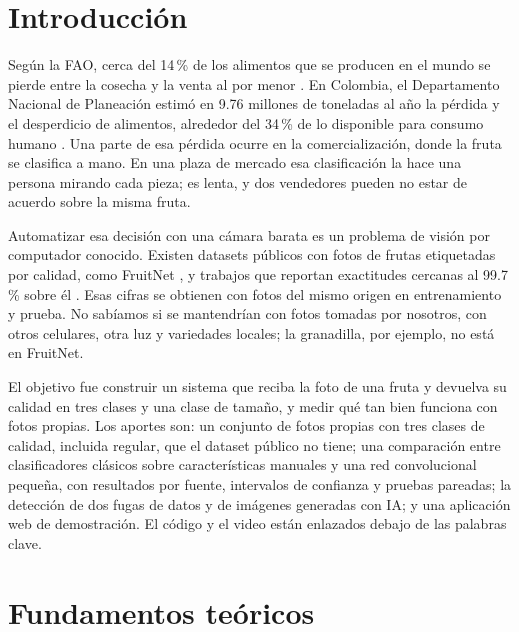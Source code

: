 \documentclass[conference]{IEEEtran}
\begin{document}
\section{Introducción}

Según la FAO, cerca del 14\,\% de los alimentos que se producen en el mundo se pierde entre la cosecha y la venta al por menor \cite{fao2019}. En Colombia, el Departamento Nacional de Planeación estimó en 9.76 millones de toneladas al año la pérdida y el desperdicio de alimentos, alrededor del 34\,\% de lo disponible para consumo humano \cite{dnp2016}. Una parte de esa pérdida ocurre en la comercialización, donde la fruta se clasifica a mano. En una plaza de mercado esa clasificación la hace una persona mirando cada pieza; es lenta, y dos vendedores pueden no estar de acuerdo sobre la misma fruta.

Automatizar esa decisión con una cámara barata es un problema de visión por computador conocido. Existen datasets públicos con fotos de frutas etiquetadas por calidad, como FruitNet \cite{meshram2022}, y trabajos que reportan exactitudes cercanas al 99.7\,\% sobre él \cite{morshed2022}. Esas cifras se obtienen con fotos del mismo origen en entrenamiento y prueba. No sabíamos si se mantendrían con fotos tomadas por nosotros, con otros celulares, otra luz y variedades locales; la granadilla, por ejemplo, no está en FruitNet.

El objetivo fue construir un sistema que reciba la foto de una fruta y devuelva su calidad en tres clases y una clase de tamaño, y medir qué tan bien funciona con fotos propias. Los aportes son: un conjunto de fotos propias con tres clases de calidad, incluida regular, que el dataset público no tiene; una comparación entre clasificadores clásicos sobre características manuales y una red convolucional pequeña, con resultados por fuente, intervalos de confianza y pruebas pareadas; la detección de dos fugas de datos y de imágenes generadas con IA; y una aplicación web de demostración. El código y el video están enlazados debajo de las palabras clave.

\section{Fundamentos teóricos}
\end{document}
